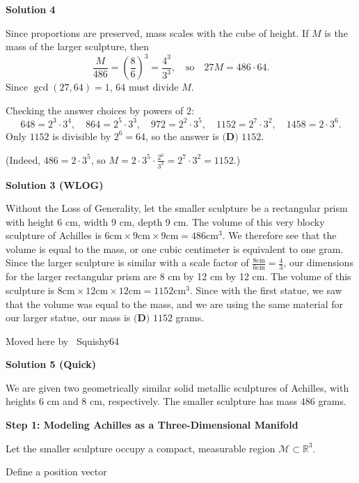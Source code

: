 \begin{enumerate}
 



\textbf{Solution 4}

Since proportions are preserved, mass scales with the cube of height. If $M$ is the mass of the larger sculpture, then
 \[\frac{M}{486} = \left(\frac{8}{6}\right)^3 = \frac{4^3}{3^3}, \quad\text{so}\quad 27M = 486\cdot 64.\]Since $\gcd(27, 64) = 1$, $64$ must divide $M$.

 Checking the answer choices by powers of $2$:
 \[648 = 2^3\cdot 3^4,\quad 864 = 2^5\cdot 3^3,\quad 972 = 2^2\cdot 3^5,\quad 1152 = 2^7\cdot 3^2,\quad 1458 = 2\cdot 3^6.\]Only $1152$ is divisible by $2^6 = 64$, so the answer is $\boxed{\textbf{(D) }1152}$.

 (Indeed, $486 = 2\cdot 3^5$, so $M = 2\cdot 3^5\cdot\frac{2^6}{3^3} = 2^7\cdot 3^2 = 1152$.)

 



\textbf{Solution 3 (WLOG)}

Without the Loss of Generality, let the smaller sculpture be a rectangular prism with height 6 cm, width 9 cm, depth 9 cm.  The volume of this very blocky sculpture of Achilles is $6 \text{cm}\times 9\text{cm}\times 9\text{cm}=486\text{cm}^3$.  We therefore see that the volume is equal to the mass, or one cubic centimeter is equivalent to one gram.  Since the larger sculpture is similar with a scale factor of $\frac{8 \text{cm}}{6\text{cm}}=\frac{4}{3}$, our dimensions for the larger rectangular prism are 8 cm by 12 cm by 12 cm.  The volume of this sculpture is $8 \text{cm}\times 12\text{cm}\times 12\text{cm}=1152\text{cm}^3$.  Since with the first statue, we saw that the volume was equal to the mass, and we are using the same material for our larger statue, our mass is $\boxed{\textbf{(D) } 1152}$ grams.

 Moved here by ~Squishy64

 



\textbf{Solution 5 (Quick)}

We are given two geometrically similar solid metallic sculptures of Achilles, with heights $6$ cm and $8$ cm, respectively. The smaller sculpture has mass $486$ grams.

 \textbf{Step 1: Modeling Achilles as a Three-Dimensional Manifold}

 Let the smaller sculpture occupy a compact, measurable region $\mathcal{M}\subset\mathbb{R}^3$.

 Define a position vector


\end{enumerate}
